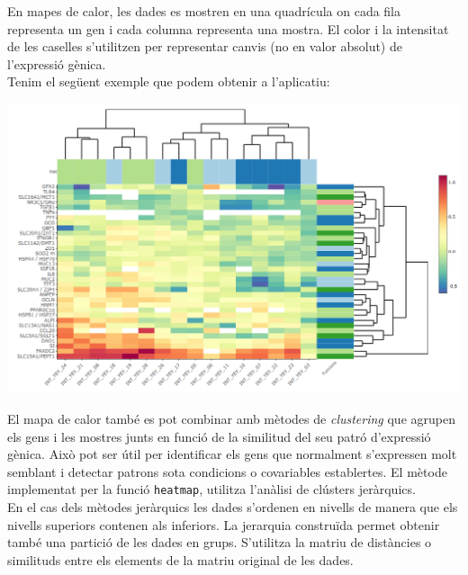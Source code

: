 \documentclass[english]{article}
\begin{document}
En mapes de calor, les dades es mostren en una quadrícula on cada fila representa un gen i cada columna representa una mostra. El color i la intensitat de les caselles s'utilitzen per representar canvis (no en valor absolut) de l'expressió gènica.
\\

Tenim el següent exemple que podem obtenir a l'aplicatiu:
\begin{center}
\includegraphics[scale=0.2]{heatmap.png}
\end{center}

El mapa de calor també es pot combinar amb mètodes de \textit{clustering} que agrupen els gens i les mostres junts en funció de la similitud del seu patró d'expressió gènica. Això pot ser útil per identificar els gens que normalment s'expressen molt semblant i detectar patrons sota condicions o covariables establertes. El mètode implementat per la funció \texttt{heatmap}, utilitza l'anàlisi de clústers jeràrquics.
\\

En el cas dels mètodes jeràrquics les dades s'ordenen en nivells de manera que els nivells superiors contenen als inferiors. La jerarquia construïda permet obtenir també una partició de les dades en grups. S'utilitza la matriu de distàncies o similituds entre els elements de la matriu original de les dades.
\\
\end{document}
